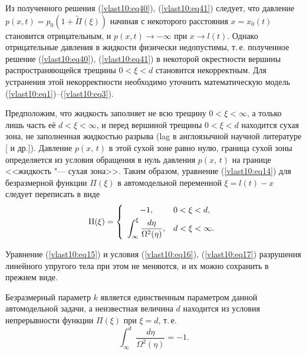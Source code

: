 Из полученного решения (\ref{vlast10:eq40}), (\ref{vlast10:eq41})
следует, что давление $p(x,t) = p_0(1 + \tilde
\Pi (\xi ))$  начиная с некоторого расстояния
$x = {x_0}(t)$ становится отрицательным, и
$p(x,t) \to  - \infty $ при
$x \to l(t)$.
Однако отрицательные давления в жидкости физически
недопустимы, т.\,е. полученное решение (\ref{vlast10:eq40}), (\ref{vlast10:eq41})
в некоторой окрестности вершины распространяющейся трещины
$0 < \xi  < d$ становится
некорректным. Для устранения этой некорректности необходимо уточнить
математическую модель (\ref{vlast10:eq1})--(\ref{vlast10:eq3}).

Предположим, что жидкость заполняет не всю трещину
$0 < \xi  < \infty $, а только лишь часть её
$ d  < \xi  < \infty $, и перед
вершиной трещины $0 < \xi  <  d$
находится сухая зона, не заполненная жидкостью разрыва (lag в
англоязычной научной литературе [ и др.]). Давление $p(x,\,t)$ в этой
сухой зоне равно нулю, граница сухой зоны определяется из условия
обращения в нуль давления $p(x,\,t)$ на границе <<жидкость "--- сухая зона>>. Таким образом, уравнение (\ref{vlast10:eq14})
для безразмерной функции  $\Pi ( \xi)$  в автомодельной переменной $\xi  =
l(t) - x$ следует переписать в виде
\begin{equation}
\Pi ( \xi ) =
\left\{
\begin{array}{cl}
- 1, &0 < \xi  <  d, \vspace{1mm} \\
\displaystyle
\int _\infty ^\xi  \dfrac{d\eta }{\Omega ^2 (\eta )}, &
d  < \xi  < \infty .
\end{array}
\right. \label{vlast10:eq42}
\end{equation}

Уравнение (\ref{vlast10:eq15})
и условия (\ref{vlast10:eq16}), (\ref{vlast10:eq17})
разрушения линейного упругого тела при этом не меняются, и их можно
сохранить в прежнем виде.

Безразмерный параметр $k$ является единственным параметром
данной автомодельной задачи, а неизвестная величина $d$ находится из условия непрерывности функции
$\Pi ( \xi  )$ при
$\xi  =  d$, т.\,е.
\begin{equation}
\int _\infty^d  \frac{d\eta }{\Omega
^2 (\eta )}  =  - 1.
\label{vlast10:eq43}
\end{equation}


